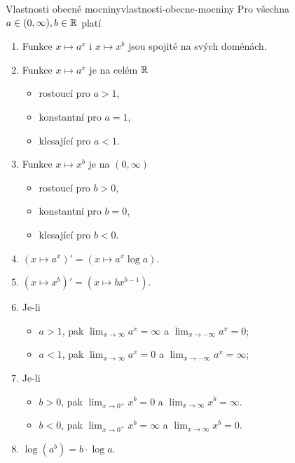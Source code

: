 \begin{proposition}{Vlastnosti obecné mocniny}{vlastnosti-obecne-mocniny}
 Pro všechna $a \in (0,\infty), b \in \mathbb{R}$ platí
 \begin{enumerate}[label=(O\arabic*)]
  \item Funkce $x \mapsto a^{x}$ i $x \mapsto x^{b}$ jsou spojité na svých
   doménách.
  \item Funkce $x \mapsto a^{x}$ je na celém $\mathbb{R}$ 
   \begin{itemize}
    \item rostoucí pro $a > 1$,
    \item konstantní pro $a = 1$,
    \item klesající pro $a < 1$.
   \end{itemize}
  \item Funkce $x \mapsto x^{b}$ je na $(0,\infty)$
   \begin{itemize}
    \item rostoucí pro $b > 0$,
    \item konstantní pro $b = 0$,
    \item klesající pro $b < 0$.
   \end{itemize}
  \item $(x \mapsto a^{x})' = (x \mapsto a^{x} \log a)$.
  \item $(x \mapsto x^{b})' = (x \mapsto bx^{b-1})$.
  \item Je-li
   \begin{itemize}
    \item $a > 1$, pak $\lim_{x \to \infty} a^{x} = \infty$ a $\lim_{x \to
     -\infty} a^{x} = 0$;
    \item $a < 1$, pak $\lim_{x \to \infty} a^{x} = 0$ a $\lim_{x \to -\infty}
     a^{x} = \infty$;
   \end{itemize}
  \item Je-li 
   \begin{itemize}
    \item $b > 0$, pak $\lim_{x \to 0^{+}} x^{b} = 0$ a $\lim_{x \to \infty}
     x^{b} = \infty$.
    \item $b < 0$, pak $\lim_{x \to 0^{+}} x^{b} = \infty$ a $\lim_{x \to
     \infty} x^{b} = 0$.
   \end{itemize}
  \item $\log(a^{b}) = b \cdot \log a$.
 \end{enumerate}
\end{proposition}

